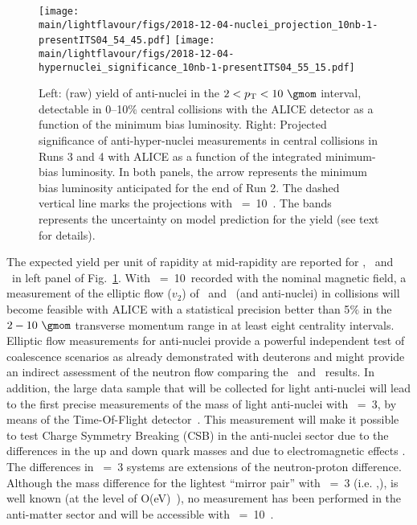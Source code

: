 \begin{figure}%
\begin{center}
\texttt{[image: \\main/lightflavour/figs/2018-12-04-nuclei\_projection\_10nb-1-presentITS04\_54\_45.pdf]}
\texttt{[image: \\main/lightflavour/figs/2018-12-04-hypernuclei\_significance\_10nb-1-presentITS04\_55\_15.pdf]}
\end{center}
\caption{Left: (raw) yield of anti-nuclei in the $2 <\pT< 10~\gmom$ interval, detectable in 0--10$\%$ central \PbPb collisions with the ALICE detector as a function of the minimum bias luminosity. 
Right: Projected significance of anti-hyper-nuclei measurements in central \PbPb collisions in Runs 3 and 4 with ALICE as a function of the integrated minimum-bias luminosity. In both panels, the arrow represents the minimum bias \PbPb luminosity anticipated for the end of Run 2. The dashed vertical line marks the projections with \Lint~=~10~\nbInv. The bands represents the uncertainty on model prediction for the yield (see text for details).
}
\label{fig:yieldrun34}
\end{figure}

The expected yield per unit of rapidity at mid-rapidity are reported for \antid, \antihethree\ and \antihefour\ in left panel of Fig.~\ref{fig:yieldrun34}.
With \Lint~=~10~\nbInv recorded with the nominal magnetic field, a measurement of the elliptic flow ($v_2$) of \hethree~and \tritium~(and anti-nuclei) in \PbPb collisions will become feasible with ALICE with a statistical precision better than 5$\%$ in the $2-10~\gmom$ transverse momentum range in at least eight centrality intervals. 
Elliptic flow measurements for anti-nuclei provide a powerful independent test of coalescence scenarios as already demonstrated with deuterons \cite{Acharya:2017dmc} and might provide an indirect assessment of the neutron flow comparing the \hethree\ and \tritium\ results. 
%
In addition, the large data sample that will be collected for light anti-nuclei will lead to the first precise measurements of the mass of light anti-nuclei with \Anucl~=~3, by means of the Time-Of-Flight detector~\cite{Adam:2015pna}. 
This measurement will make it possible to test Charge Symmetry Breaking (CSB) in the anti-nuclei sector due to the differences in the up and down quark masses and due to electromagnetic effects \cite{Miller:1990ky}. 
The differences in \Anucl~=~3 systems are extensions of the neutron-proton difference. Although the mass difference for the lightest ``mirror pair'' with \Anucl~=~3 (i.e. \tritium,\hethree), is well known (at the level of O(eV)~\cite{Audi:2002rp}), no measurement has been performed in the anti-matter sector and will be accessible with \Lint~=~10~\nbInv. 

